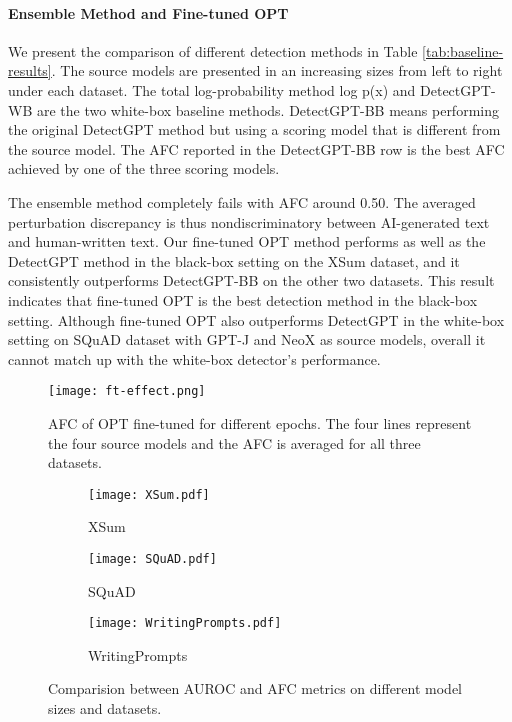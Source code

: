 \documentclass[11pt]{article}
\begin{document}
\paragraph{Ensemble Method and Fine-tuned OPT} We present the comparison of different detection methods in Table \ref{tab:baseline-results}. The source models are presented in an increasing sizes from left to right under each dataset. The total log-probability method log p(x) and DetectGPT-WB are the two white-box baseline methods. DetectGPT-BB means performing the original DetectGPT method but using a scoring model that is different from the source model. The AFC reported in the DetectGPT-BB row is the best AFC achieved by one of the three scoring models.

The ensemble method completely fails with AFC around 0.50. The averaged perturbation discrepancy is thus nondiscriminatory between AI-generated text and human-written text. Our fine-tuned OPT method performs as well as the DetectGPT method in the black-box setting on the XSum dataset, and it consistently outperforms DetectGPT-BB on the other two datasets. This result indicates that fine-tuned OPT is the best detection method in the black-box setting. Although fine-tuned OPT also outperforms DetectGPT in the white-box setting on SQuAD dataset with GPT-J and NeoX as source models, overall it cannot match up with the white-box detector's performance.

\begin{figure}
    \centering
    \texttt{[image: ft-effect.png]}
    \vspace{-3mm}
    \caption{AFC of OPT fine-tuned for different epochs. The four lines represent the four source models and the AFC is averaged for all three datasets.}
    \vspace{-5mm}
    \label{fig:fine-tune effect}
\end{figure}

\begin{figure*}[h]
    \centering
    \begin{subfigure}[b]{0.3\textwidth}
    \centering
    \texttt{[image: XSum.pdf]}
    \caption{XSum}
    \label{fig: XSum}
    \end{subfigure}
    \hfill
    \begin{subfigure}[b]{0.3\textwidth}
    \centering
    \texttt{[image: SQuAD.pdf]}
    \caption{SQuAD}
    \label{fig: SQuAD}
    \end{subfigure}
    \hfill
    \begin{subfigure}[b]{0.3\textwidth}
    \centering
    \texttt{[image: WritingPrompts.pdf]}
    \caption{WritingPrompts}
    \label{fig: WritingPrompts}
    \end{subfigure}
    \vspace{-3mm}
    \caption{Comparision between AUROC and AFC metrics on different model sizes and datasets.}
    \vspace{-5mm}
    \label{fig: comparison}
\end{figure*}
\end{document}
